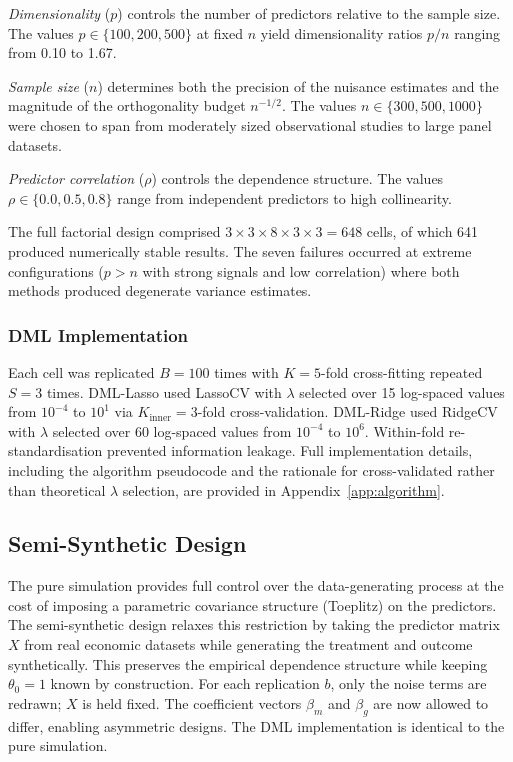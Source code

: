 \documentclass[a4paper,10.5pt]{article}
\begin{document}
\textit{Dimensionality} ($p$) controls the number of predictors relative to the sample size. The values $p \in \{100, 200, 500\}$ at fixed $n$ yield dimensionality ratios $p/n$ ranging from 0.10 to 1.67.

\textit{Sample size} ($n$) determines both the precision of the nuisance estimates and the magnitude of the orthogonality budget $n^{-1/2}$. The values $n \in \{300, 500, 1000\}$ were chosen to span from moderately sized observational studies to large panel datasets.

\textit{Predictor correlation} ($\rho$) controls the dependence structure. The values $\rho \in \{0.0, 0.5, 0.8\}$ range from independent predictors to high collinearity.

The full factorial design comprised $3 \times 3 \times 8 \times 3 \times 3 = 648$ cells, of which 641 produced numerically stable results. The seven failures occurred at extreme configurations ($p > n$ with strong signals and low correlation) where both methods produced degenerate variance estimates.

\subsubsection*{DML Implementation}

Each cell was replicated $B = 100$ times with $K = 5$-fold cross-fitting repeated $S = 3$ times. DML-Lasso used LassoCV with $\lambda$ selected over 15 log-spaced values from $10^{-4}$ to $10^1$ via $K_{\text{inner}} = 3$-fold cross-validation. DML-Ridge used RidgeCV with $\lambda$ selected over 60 log-spaced values from $10^{-4}$ to $10^6$. Within-fold re-standardisation prevented information leakage. Full implementation details, including the algorithm pseudocode and the rationale for cross-validated rather than theoretical $\lambda$ selection, are provided in Appendix~\ref{app:algorithm}.


\subsection{Semi-Synthetic Design}\label{sec:semi_synth}

The pure simulation provides full control over the data-generating process at the cost of imposing a parametric covariance structure (Toeplitz) on the predictors. The semi-synthetic design relaxes this restriction by taking the predictor matrix $X$ from real economic datasets while generating the treatment and outcome synthetically. This preserves the empirical dependence structure while keeping $\theta_0 = 1$ known by construction. For each replication $b$, only the noise terms are redrawn; $X$ is held fixed. The coefficient vectors $\beta_m$ and $\beta_g$ are now allowed to differ, enabling asymmetric designs. The DML implementation is identical to the pure simulation.
\end{document}
